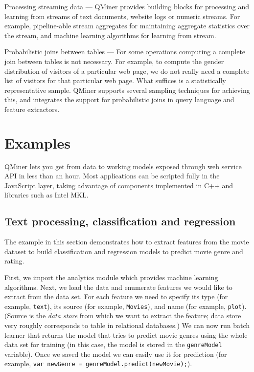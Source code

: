 \documentclass{article} %
\begin{document}
   Processing streaming data --- QMiner provides building blocks for processing and learning from streams of text documents, website logs or numeric streams. For example, pipeline-able stream aggregates for maintaining aggregate statistics over the stream, and machine learning algorithms for learning from stream.
   
   Probabilistic joins between tables --- For some operations computing a complete join between tables is not necessary. For example, to compute the gender distribution of visitors of a particular web page, we do not really need a complete list of visitors for that particular web page. What suffices is a statistically representative sample. QMiner supports several sampling techniques for achieving this, and integrates the support for probabilistic joins in query language and feature extractors.


\section{Examples}
   QMiner lets you get from data to working models exposed through web service API in less than an hour. Most applications can be scripted fully in the JavaScript layer, taking advantage of components implemented in C++ and libraries such as Intel MKL.

   \subsection{Text processing, classification and regression}
      The example in this section demonstrates how to extract features from the movie dataset to build classification and regression models to predict movie genre and rating. 
      
      First, we import the analytics module which provides machine learning algorithms. Next, we load the data and enumerate features we would like to extract from the data set. For each feature we need to specify its type (for example, \texttt{text}), its source (for example, \texttt{Movies}), and name (for example, \texttt{plot}). (Source is the \emph{data store} from which we want to extract the feature; data store very roughly corresponds to table in relational databases.) We can now run batch learner that returns the model that tries to predict movie genres using the whole data set for training (in this case, the model is stored in the \texttt{genreModel} variable). Once we saved the model we can easily use it for prediction (for example, \texttt{var newGenre = genreModel.predict(newMovie);}). 
\end{document}
